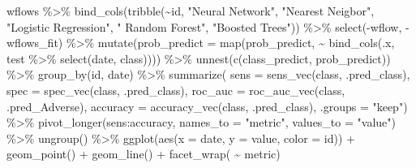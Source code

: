 \documentclass[
]{article}
\newenvironment{Shaded}{\begin{snugshade}}{\end{snugshade}}
\newcommand{\AttributeTok}[1]{\textcolor[rgb]{0.77,0.63,0.00}{#1}}
\newcommand{\FunctionTok}[1]{\textcolor[rgb]{0.00,0.00,0.00}{#1}}
\newcommand{\NormalTok}[1]{#1}
\newcommand{\SpecialCharTok}[1]{\textcolor[rgb]{0.00,0.00,0.00}{#1}}
\newcommand{\StringTok}[1]{\textcolor[rgb]{0.31,0.60,0.02}{#1}}
\begin{document}
\begin{Shaded}
\begin{Highlighting}[]
\NormalTok{wflows }\SpecialCharTok{\%\textgreater{}\%}
  \FunctionTok{bind\_cols}\NormalTok{(}\FunctionTok{tribble}\NormalTok{(}\SpecialCharTok{\textasciitilde{}}\NormalTok{id, }\StringTok{"Neural Network"}\NormalTok{, }\StringTok{"Nearest Neigbor"}\NormalTok{, }\StringTok{"Logistic Regression"}\NormalTok{, }
      \StringTok{" Random Forest"}\NormalTok{, }\StringTok{"Boosted Trees"}\NormalTok{)) }\SpecialCharTok{\%\textgreater{}\%}
  \FunctionTok{select}\NormalTok{(}\SpecialCharTok{{-}}\NormalTok{wflow, }\SpecialCharTok{{-}}\NormalTok{wflows\_fit) }\SpecialCharTok{\%\textgreater{}\%}
  \FunctionTok{mutate}\NormalTok{(}\AttributeTok{prob\_predict =} \FunctionTok{map}\NormalTok{(prob\_predict, }\SpecialCharTok{\textasciitilde{}} \FunctionTok{bind\_cols}\NormalTok{(.x, test }\SpecialCharTok{\%\textgreater{}\%} \FunctionTok{select}\NormalTok{(date, class)))) }\SpecialCharTok{\%\textgreater{}\%}
  \FunctionTok{unnest}\NormalTok{(}\FunctionTok{c}\NormalTok{(class\_predict, prob\_predict)) }\SpecialCharTok{\%\textgreater{}\%}
  \FunctionTok{group\_by}\NormalTok{(id, date) }\SpecialCharTok{\%\textgreater{}\%}
  \FunctionTok{summarize}\NormalTok{(}
            \AttributeTok{sens =} \FunctionTok{sens\_vec}\NormalTok{(class, .pred\_class),}
            \AttributeTok{spec =} \FunctionTok{spec\_vec}\NormalTok{(class, .pred\_class),}
            \AttributeTok{roc\_auc =} \FunctionTok{roc\_auc\_vec}\NormalTok{(class, .pred\_Adverse),}
            \AttributeTok{accuracy =} \FunctionTok{accuracy\_vec}\NormalTok{(class, .pred\_class), }\AttributeTok{.groups =} \StringTok{"keep"}\NormalTok{) }\SpecialCharTok{\%\textgreater{}\%}
  \FunctionTok{pivot\_longer}\NormalTok{(sens}\SpecialCharTok{:}\NormalTok{accuracy, }\AttributeTok{names\_to =} \StringTok{"metric"}\NormalTok{, }\AttributeTok{values\_to =} \StringTok{"value"}\NormalTok{) }\SpecialCharTok{\%\textgreater{}\%}
  \FunctionTok{ungroup}\NormalTok{() }\SpecialCharTok{\%\textgreater{}\%}
  \FunctionTok{ggplot}\NormalTok{(}\FunctionTok{aes}\NormalTok{(}\AttributeTok{x =}\NormalTok{ date, }\AttributeTok{y =}\NormalTok{ value, }\AttributeTok{color =}\NormalTok{ id)) }\SpecialCharTok{+}
  \FunctionTok{geom\_point}\NormalTok{() }\SpecialCharTok{+}
  \FunctionTok{geom\_line}\NormalTok{() }\SpecialCharTok{+}
  \FunctionTok{facet\_wrap}\NormalTok{( }\SpecialCharTok{\textasciitilde{}}\NormalTok{ metric)}
\end{Highlighting}
\end{Shaded}
\end{document}
